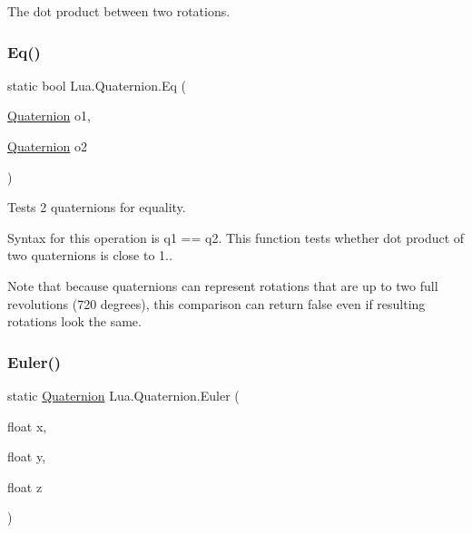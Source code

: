 The dot product between two rotations. 

\mbox{\label{class_lua_1_1_quaternion_a9ecf171f4a2a8c0ad3ced7564ada2c6d}} 
\subsubsection{\texorpdfstring{Eq()}{Eq()}}
{\footnotesize\ttfamily static bool Lua.\+Quaternion.\+Eq (\begin{DoxyParamCaption}\item[{\mbox{\hyperlink{class_lua_1_1_quaternion}{Quaternion}}}]{o1,  }\item[{\mbox{\hyperlink{class_lua_1_1_quaternion}{Quaternion}}}]{o2 }\end{DoxyParamCaption})\hspace{0.3cm}{\ttfamily [static]}}



Tests 2 quaternions for equality. 

Syntax for this operation is {\ttfamily q1 == q2}. This function tests whether dot product of two quaternions is close to 1..

Note that because quaternions can represent rotations that are up to two full revolutions (720 degrees), this comparison can return false even if resulting rotations look the same. \mbox{\label{class_lua_1_1_quaternion_ac7134c2bdc28902fc519d42b7b803d9f}} 
\subsubsection{\texorpdfstring{Euler()}{Euler()}\hspace{0.1cm}{\footnotesize\ttfamily [1/2]}}
{\footnotesize\ttfamily static \mbox{\hyperlink{class_lua_1_1_quaternion}{Quaternion}} Lua.\+Quaternion.\+Euler (\begin{DoxyParamCaption}\item[{float}]{x,  }\item[{float}]{y,  }\item[{float}]{z }\end{DoxyParamCaption})\hspace{0.3cm}{\ttfamily [static]}}



